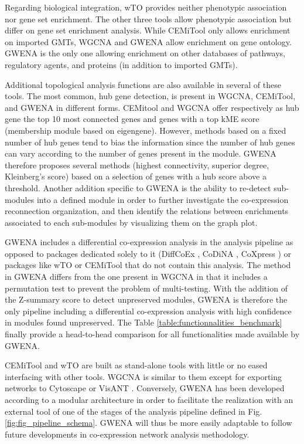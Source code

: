 Regarding biological integration, wTO provides neither phenotypic association nor gene set enrichment. The other three tools allow phenotypic association but differ on gene set enrichment analysis. While CEMiTool only allows enrichment on imported GMTs, WGCNA and GWENA allow enrichment on gene ontology. GWENA is the only one allowing enrichment on other databases of pathways, regulatory agents, and proteins (in addition to imported GMTs).

Additional topological analysis functions are also available in several of these tools. The most common, hub gene detection, is present in WGCNA, CEMiTool, and GWENA in different forms. CEMitool and WGCNA offer respectively as hub gene the top 10 most connected genes and genes with a top kME score (membership module based on eigengene). However, methods based on a fixed number of hub genes tend to bias the information since the number of hub genes can vary according to the number of genes present in the module. GWENA therefore proposes several methods (highest connectivity, superior degree, Kleinberg's score) based on a selection of genes with a hub score above a threshold. Another addition specific to GWENA is the ability to re-detect sub-modules into a defined module in order to further investigate the co-expression reconnection organization, and then identify the relations between enrichments associated to each sub-modules by visualizing them on the graph plot.

GWENA includes a differential co-expression analysis in the analysis pipeline as opposed to packages dedicated solely to it (DiffCoEx , CoDiNA , CoXpress ) or packages like wTO or CEMiTool that do not contain this analysis. The method in GWENA differs from the one present in WGCNA in that it includes a permutation test to prevent the problem of multi-testing. With the addition of the Z-summary score to detect unpreserved modules, GWENA is therefore the only pipeline including a differential co-expression analysis with high confidence in modules found unpreserved. The Table \ref{table:functionnalities_benchmark} finally provide a head-to-head comparison for all functionalities made available by GWENA.

CEMiTool and wTO are built as stand-alone tools with little or no eased interfacing with other tools. WGCNA is similar to them except for exporting networks to Cytoscape  or VisANT . Conversely, GWENA has been developed according to a modular architecture in order to facilitate the realization with an external tool of one of the stages of the analysis pipeline defined in Fig. \ref{fig:fig_pipeline_schema}. GWENA will thus be more easily adaptable to follow future developments in co-expression network analysis methodology.

